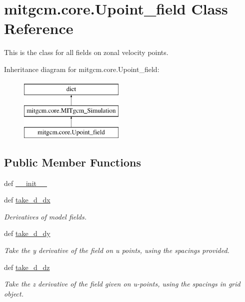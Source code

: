 \hypertarget{classmitgcm_1_1core_1_1Upoint__field}{\section{mitgcm.\+core.\+Upoint\+\_\+field Class Reference}
\label{classmitgcm_1_1core_1_1Upoint__field}
}


This is the class for all fields on zonal velocity points.  


Inheritance diagram for mitgcm.\+core.\+Upoint\+\_\+field\+:\begin{figure}[H]
\begin{center}
\leavevmode
\includegraphics[height=3.000000cm]{classmitgcm_1_1core_1_1Upoint__field}
\end{center}
\end{figure}
\subsection*{Public Member Functions}
\begin{DoxyCompactItemize}
\item 
def \hyperlink{classmitgcm_1_1core_1_1Upoint__field_ab4adbcfd61c7b303b8499a5228cd6f77}{\+\_\+\+\_\+init\+\_\+\+\_\+}
\item 
def \hyperlink{classmitgcm_1_1core_1_1Upoint__field_a40c4ea3c2527688e8419c0a276e27d5c}{take\+\_\+d\+\_\+dx}
\begin{DoxyCompactList}\small\item\em Derivatives of model fields. \end{DoxyCompactList}\item 
def \hyperlink{classmitgcm_1_1core_1_1Upoint__field_acac1cef0245cd27c0975a84bef22a71d}{take\+\_\+d\+\_\+dy}
\begin{DoxyCompactList}\small\item\em Take the y derivative of the field on u points, using the spacings provided. \end{DoxyCompactList}\item 
def \hyperlink{classmitgcm_1_1core_1_1Upoint__field_acbc550b512401054ac04eca3dc7318af}{take\+\_\+d\+\_\+dz}
\begin{DoxyCompactList}\small\item\em Take the z derivative of the field given on u-\/points, using the spacings in grid object. \end{DoxyCompactList}\end{DoxyCompactItemize}

